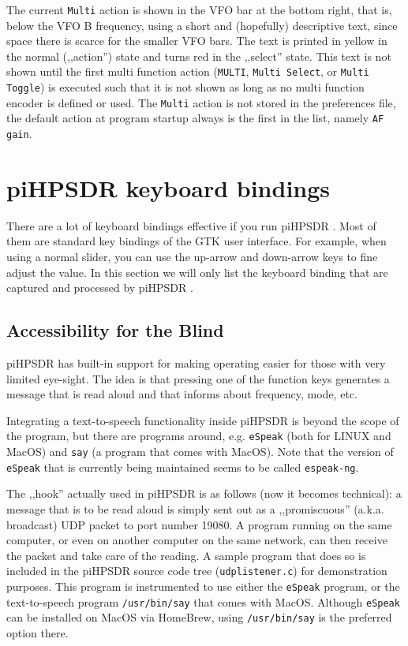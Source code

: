 \documentclass[12pt]{book}
\def\bltt#1{\texttt{\color{blue}#1}}
\def\pH{pi\-HPSDR }
\begin{document}
The current \bltt{Multi} action is shown in the VFO bar at the bottom right, that is, below
the VFO B frequency, using a short and (hopefully) descriptive text, since space there is
scarce for the smaller VFO bars. The text is printed in yellow in the normal (,,action'') state and
turns red in the ,,select'' state. This text is not shown until the first multi function action
(\bltt{MULTI}, \bltt{Multi Select}, or \bltt{Multi Toggle}) is executed such that it is not
shown as long as no multi function encoder is defined or used. The \bltt{Multi} action is not
stored in the preferences file, the default action at program startup always is the first in the list,
namely \bltt{AF gain}.
\chapter[Keyboard bindings]{\pH keyboard bindings}

There are a lot of keyboard bindings effective if you run \pH. Most of them are
standard key bindings of the GTK user interface. For example, when using a normal
slider, you can use the up-arrow and down-arrow keys to fine adjust the value. In this
section we will only list the keyboard binding that are captured and processed by \pH.

\section{Accessibility for the Blind}

\pH has built-in support for making operating easier for those with very limited
eye-sight. The idea is that pressing one of the function keys generates a message that
is read aloud and that informs about frequency, mode, etc.

Integrating a text-to-speech functionality inside \pH is beyond the scope of the program,
but there are programs around, e.g. \texttt{eSpeak} (both for LINUX and MacOS) and
\texttt{say} (a program that comes with MacOS). Note that the version of \texttt{eSpeak}
that is currently being maintained seems to be called \texttt{espeak-ng}.

The ,,hook'' actually used
in \pH is as follows (now it becomes technical): a message that is to be read aloud is
simply sent out as a ,,promiscuous'' (a.k.a. broadcast) UDP packet to port number 19080.
A program running on the same computer, or even on another computer on the same network, can
then receive the packet and take care of the reading. A sample program that does so
is included in the \pH source code tree (\texttt{udplistener.c}) for demonstration purposes.
This program is instrumented to use either the \texttt{eSpeak} program, or the text-to-speech
program \texttt{/usr/bin/say} that comes with MacOS. Although \texttt{eSpeak} can
be installed on MacOS via HomeBrew, using  \texttt{/usr/bin/say}  is the preferred option there.
\end{document}
